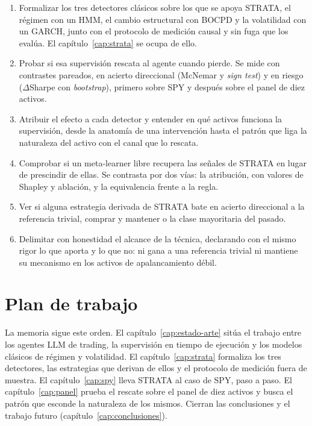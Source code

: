 \begin{enumerate}
  \item Formalizar los tres detectores clásicos sobre los que se apoya STRATA, el régimen con un HMM, el cambio estructural con BOCPD y la volatilidad con un GARCH, junto con el protocolo de medición causal y sin fuga que los evalúa. El capítulo~\ref{cap:strata} se ocupa de ello.
  \item Probar si esa supervisión rescata al agente cuando pierde. Se mide con contrastes pareados, en acierto direccional (McNemar y \emph{sign test}) y en riesgo ($\Delta$Sharpe con \emph{bootstrap}), primero sobre SPY y después sobre el panel de diez activos.
  \item Atribuir el efecto a cada detector y entender en qué activos funciona la supervisión, desde la anatomía de una intervención hasta el patrón que liga la naturaleza del activo con el canal que lo rescata.
  \item Comprobar si un meta-learner libre recupera las señales de STRATA en lugar de prescindir de ellas. Se contrasta por dos vías: la atribución, con valores de Shapley y ablación, y la equivalencia frente a la regla.
  \item Ver si alguna estrategia derivada de STRATA bate en acierto direccional a la referencia trivial, comprar y mantener o la clase mayoritaria del pasado.
  \item Delimitar con honestidad el alcance de la técnica, declarando con el mismo rigor lo que aporta y lo que no: ni gana a una referencia trivial ni mantiene su mecanismo en los activos de apalancamiento débil.
\end{enumerate}

\section{Plan de trabajo}
\label{sec:obj-plan}

La memoria sigue este orden. El capítulo~\ref{cap:estado-arte} sitúa el trabajo entre los agentes LLM de trading, la supervisión en tiempo de ejecución y los modelos clásicos de régimen y volatilidad. El capítulo~\ref{cap:strata} formaliza los tres detectores, las estrategias que derivan de ellos y el protocolo de medición fuera de muestra. El capítulo~\ref{cap:spy} lleva STRATA al caso de SPY, paso a paso. El capítulo~\ref{cap:panel} prueba el rescate sobre el panel de diez activos y busca el patrón que esconde la naturaleza de los mismos. Cierran las conclusiones y el trabajo futuro (capítulo~\ref{cap:conclusiones}).
